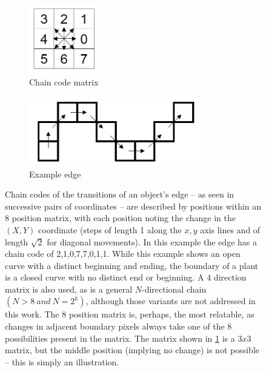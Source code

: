\documentclass[letterpaper, notitlepage]{report}
\begin{document}
{ \begin{figure}[h!]
	\centering
	\begin{subfigure}[h]{.4\textwidth}
	  \centering
	  \includegraphics[height=3cm]{./figures/chain-code-matrix.jpg}
	  \caption{Chain code matrix}
	  \label{fig:chain-code-matrix}
	\end{subfigure}
	\begin{subfigure}[h]{.4\textwidth}
	  \centering
	  \includegraphics[height=3cm]{./figures/chain-code-cells.jpg}
	  \caption{Example edge}
	  \label{fig:chain-example}
	\end{subfigure}
	\caption[Boundary chain codes]{Chain codes of the transitions of an object's edge -- as seen in successive pairs of coordinates -- are described by positions within an 8 position matrix, with each position noting the change in the $(X, Y)$ coordinate (steps of length 1 along the $x,y$ axis lines and of length $\sqrt{2}$ for diagonal movements). In this example the edge has a chain code of 2,1,0,7,7,0,1,1. While this example shows an open curve with a distinct beginning and ending, the boundary of a plant is a closed curve with no distinct end or beginning. A 4 direction matrix is also used, as is a general $N$-directional chain $(N > 8\ and\ N =2^k)$, although those variants are not addressed in this work. The 8 position matrix is, perhaps, the most relatable, as changes in adjacent boundary pixels always take one of the 8 possibilities present in the matrix. The matrix shown in \ref{fig:chain-code-matrix} is a $3x3$ matrix, but the middle position (implying no change) is not possible -- this is simply an illustration.}
	\label{fig:chain-codes}
\end{figure}

}
\end{document}
